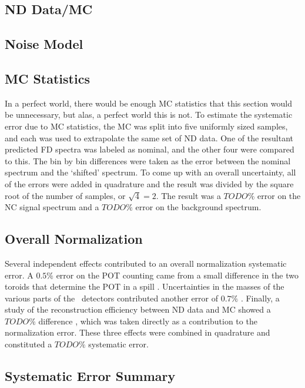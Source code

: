 \subsection{ND Data/MC}

\subsection{Noise Model}

\subsection{MC Statistics}

In a perfect world, there would be enough MC statistics that this section would be unnecessary, but alas, a perfect world this is not. To estimate the systematic error due to MC statistics, the MC was split into five uniformly sized samples, and each was used to extrapolate the same set of ND data. One of the resultant predicted FD spectra was labeled as nominal, and the other four were compared to this. The bin by bin differences were taken as the error between the nominal spectrum and the `shifted' spectrum. To come up with an overall uncertainty, all of the errors were added in quadrature and the result was divided by the square root of the number of samples, or $\sqrt{4} = 2$. The result was a $TODO\%$ error on the NC signal spectrum and a $TODO\%$ error on the background spectrum.

\subsection{Overall Normalization}

Several independent effects contributed to an overall normalization systematic error. A $0.5\%$ error on the POT counting came from a small difference in the two toroids that determine the POT in a spill \cite{ref:TNBeam}. Uncertainties in the masses of the various parts of the \nova~detectors contributed another error of $0.7\%$ \cite{ref:MassError}. Finally, a study of the reconstruction efficiency between ND data and MC showed a $TODO\%$ difference \cite{ref:NDDataMCRecoEff}, which was taken directly as a contribution to the normalization error. These three effects were combined in quadrature and constituted a $TODO\%$ systematic error.

\subsection{Systematic Error Summary}

